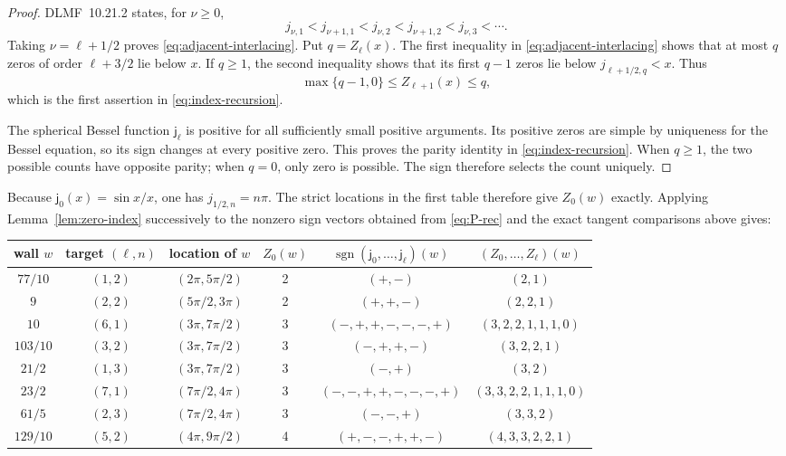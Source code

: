 \documentclass[11pt]{article}
\newcommand{\sgn}{\operatorname{sgn}}
\begin{document}
\begin{proof}
DLMF~10.21.2 states, for \(\nu\geq0\),
\[
 j_{\nu,1}<j_{\nu+1,1}<j_{\nu,2}<j_{\nu+1,2}
 <j_{\nu,3}<\cdots .
\]
Taking \(\nu=\ell+1/2\) proves
\eqref{eq:adjacent-interlacing}.  Put \(q=Z_\ell(x)\).  The first
inequality in \eqref{eq:adjacent-interlacing} shows that at most \(q\)
zeros of order \(\ell+3/2\) lie below \(x\).  If \(q\geq1\), the second
inequality shows that its first \(q-1\) zeros lie below
\(j_{\ell+1/2,q}<x\).  Thus
\[
 \max\{q-1,0\}\leq Z_{\ell+1}(x)\leq q,
\]
which is the first assertion in \eqref{eq:index-recursion}.

The spherical Bessel function \(\mathsf j_\ell\) is positive for all
sufficiently small positive arguments.  Its positive zeros are simple by
uniqueness for the Bessel equation, so its sign changes at every positive
zero.  This proves the parity identity in
\eqref{eq:index-recursion}.  When \(q\geq1\), the two possible counts have
opposite parity; when \(q=0\), only zero is possible.  The sign therefore
selects the count uniquely.
\end{proof}

Because \(\mathsf j_0(x)=\sin x/x\), one has
\(j_{1/2,n}=n\pi\).  The strict locations in the first table therefore
give \(Z_0(w)\) exactly.  Applying Lemma~\ref{lem:zero-index} successively
to the nonzero sign vectors obtained from \eqref{eq:P-rec} and the exact
tangent comparisons above gives:
\begin{center}
\scriptsize
\renewcommand{\arraystretch}{1.16}
\begin{tabular}{c|c|c|c|c|c}
\toprule
wall \(w\)&target \((\ell,n)\)&location of \(w\)&\(Z_0(w)\)&
\(\sgn(\mathsf j_0,\ldots,\mathsf j_\ell)(w)\)&
\((Z_0,\ldots,Z_\ell)(w)\)\\
\midrule
\(77/10\)&\((1,2)\)&\((2\pi,5\pi/2)\)&2&
\((+,-)\)&\((2,1)\)\\
\(9\)&\((2,2)\)&\((5\pi/2,3\pi)\)&2&
\((+,+,-)\)&\((2,2,1)\)\\
\(10\)&\((6,1)\)&\((3\pi,7\pi/2)\)&3&
\((-,+,+,-,-,-,+)\)&\((3,2,2,1,1,1,0)\)\\
\(103/10\)&\((3,2)\)&\((3\pi,7\pi/2)\)&3&
\((-,+,+,-)\)&\((3,2,2,1)\)\\
\(21/2\)&\((1,3)\)&\((3\pi,7\pi/2)\)&3&
\((-,+)\)&\((3,2)\)\\
\(23/2\)&\((7,1)\)&\((7\pi/2,4\pi)\)&3&
\((-,-,+,+,-,-,-,+)\)&\((3,3,2,2,1,1,1,0)\)\\
\(61/5\)&\((2,3)\)&\((7\pi/2,4\pi)\)&3&
\((-,-,+)\)&\((3,3,2)\)\\
\(129/10\)&\((5,2)\)&\((4\pi,9\pi/2)\)&4&
\((+,-,-,+,+,-)\)&\((4,3,3,2,2,1)\)\\
\bottomrule
\end{tabular}
\end{center}
\end{document}
